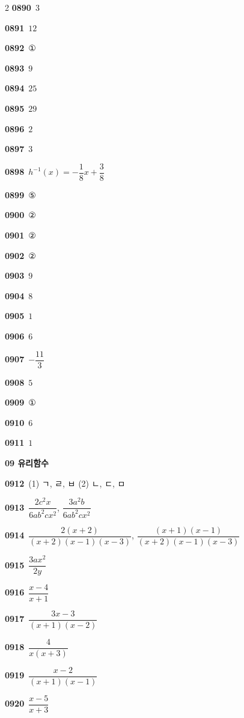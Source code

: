\documentclass[10pt,a4paper]{article}
\begin{document}
\begin{multicols}{2}
\noindent\textbf{0890}\ $3$\par
\noindent\textbf{0891}\ $12$\par
\noindent\textbf{0892}\ ①\par
\noindent\textbf{0893}\ $9$\par
\noindent\textbf{0894}\ $25$\par
\noindent\textbf{0895}\ $29$\par
\noindent\textbf{0896}\ $2$\par
\noindent\textbf{0897}\ $3$\par
\noindent\textbf{0898}\ $h^{-1}(x)=-\dfrac{1}{8}x+\dfrac{3}{8}$\par
\noindent\textbf{0899}\ ⑤\par
\noindent\textbf{0900}\ ②\par
\noindent\textbf{0901}\ ②\par
\noindent\textbf{0902}\ ②\par
\noindent\textbf{0903}\ $9$\par
\noindent\textbf{0904}\ $8$\par
\noindent\textbf{0905}\ $1$\par
\noindent\textbf{0906}\ $6$\par
\noindent\textbf{0907}\ $-\dfrac{11}{3}$\par
\noindent\textbf{0908}\ $5$\par
\noindent\textbf{0909}\ ①\par
\noindent\textbf{0910}\ $6$\par
\noindent\textbf{0911}\ $1$\par
\noindent\textbf{09 유리함수}\par\smallskip
\noindent\textbf{0912}\ (1) ㄱ, ㄹ, ㅂ (2) ㄴ, ㄷ, ㅁ\par
\noindent\textbf{0913}\ $\dfrac{2c^2x}{6ab^2cx^2}$, $\dfrac{3a^2b}{6ab^2cx^2}$\par
\noindent\textbf{0914}\ $\dfrac{2(x+2)}{(x+2)(x-1)(x-3)}$, $\dfrac{(x+1)(x-1)}{(x+2)(x-1)(x-3)}$\par
\noindent\textbf{0915}\ $\dfrac{3ax^2}{2y}$\par
\noindent\textbf{0916}\ $\dfrac{x-4}{x+1}$\par
\noindent\textbf{0917}\ $\dfrac{3x-3}{(x+1)(x-2)}$\par
\noindent\textbf{0918}\ $\dfrac{4}{x(x+3)}$\par
\noindent\textbf{0919}\ $\dfrac{x-2}{(x+1)(x-1)}$\par
\noindent\textbf{0920}\ $\dfrac{x-5}{x+3}$\par

\end{multicols}
\end{document}
